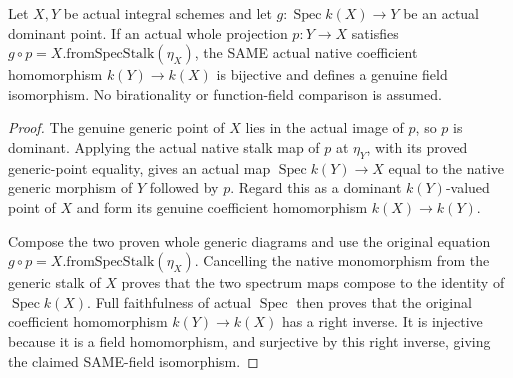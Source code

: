 \begin{theorem}
\label{scheme:generic-graph-original-function-field}
\leanok
{}
Let $X,Y$ be actual integral schemes and let
$g:\operatorname{Spec}k(X)\to Y$ be an actual dominant point. If an actual
whole projection $p:Y\to X$ satisfies
$g\circ p=X.\mathrm{fromSpecStalk}(\eta_X)$, the SAME actual native
coefficient homomorphism $k(Y)\to k(X)$ is bijective and defines a genuine
field isomorphism. No birationality or function-field comparison is assumed.
\end{theorem}
\begin{proof}
The genuine generic point of $X$ lies in the actual image of $p$, so $p$ is
dominant. Applying the actual native stalk map of $p$ at $\eta_Y$, with
its proved generic-point equality, gives an actual map
$\operatorname{Spec}k(Y)\to X$ equal to the native generic morphism of $Y$
followed by $p$. Regard this as a dominant $k(Y)$-valued point of $X$ and
form its genuine coefficient homomorphism $k(X)\to k(Y)$.

Compose the two proven whole generic diagrams and use the original equation
$g\circ p=X.\mathrm{fromSpecStalk}(\eta_X)$. Cancelling the native
monomorphism from the generic stalk of $X$ proves that the two spectrum
maps compose to the identity of $\operatorname{Spec}k(X)$. Full faithfulness
of actual $\operatorname{Spec}$ then proves that the original coefficient
homomorphism $k(Y)\to k(X)$ has a right inverse. It is injective because
it is a field homomorphism, and surjective by this right inverse, giving the
claimed SAME-field isomorphism.
\end{proof}
